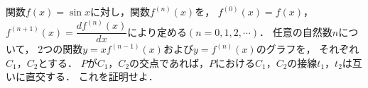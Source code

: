 \documentclass[../../main.tex]{subfiles}
\begin{document}
関数$f(x)=\sin x$に対し，関数$f^{(n)}(x)$を，
$f^{(0)}(x)=f(x)$，$\displaystyle f^{(n+1)}(x)=\dfrac{df^{(n)}(x)}{dx}$により定める$(n=0,1,2,\cdots)$．
任意の自然数$n$について，
2つの関数$y=xf^{(n-1)}(x)$および$y=f^{(n)}(x)$のグラフを，
それぞれ$C_1$，$C_2$とする．
$P$が$C_1$，$C_2$の交点であれば，$P$における$C_1$，$C_2$の接線$t_1$，$t_2$は互いに直交する．
これを証明せよ．
\end{document}
